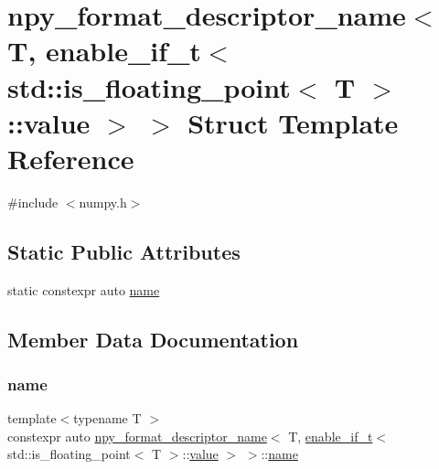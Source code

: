 \hypertarget{structnpy__format__descriptor__name_3_01_t_00_01enable__if__t_3_01std_1_1is__floating__point_3_01_t_01_4_1_1value_01_4_01_4}{}\section{npy\+\_\+format\+\_\+descriptor\+\_\+name$<$ T, enable\+\_\+if\+\_\+t$<$ std\+::is\+\_\+floating\+\_\+point$<$ T $>$\+::value $>$ $>$ Struct Template Reference}
\label{structnpy__format__descriptor__name_3_01_t_00_01enable__if__t_3_01std_1_1is__floating__point_3_01_t_01_4_1_1value_01_4_01_4}


{\ttfamily \#include $<$numpy.\+h$>$}

\subsection*{Static Public Attributes}
\begin{DoxyCompactItemize}
\item 
static constexpr auto \mbox{\hyperlink{structnpy__format__descriptor__name_3_01_t_00_01enable__if__t_3_01std_1_1is__floating__point_3_01_t_01_4_1_1value_01_4_01_4_a3539b56b508a6febec17fb61d25d3c05}{name}}
\end{DoxyCompactItemize}


\subsection{Member Data Documentation}
\mbox{\label{structnpy__format__descriptor__name_3_01_t_00_01enable__if__t_3_01std_1_1is__floating__point_3_01_t_01_4_1_1value_01_4_01_4_a3539b56b508a6febec17fb61d25d3c05}} 
\subsubsection{\texorpdfstring{name}{name}}
{\footnotesize\ttfamily template$<$typename T $>$ \\
constexpr auto \mbox{\hyperlink{structnpy__format__descriptor__name}{npy\+\_\+format\+\_\+descriptor\+\_\+name}}$<$ T, \mbox{\hyperlink{detail_2common_8h_a012819c9e8b5e04872a271f50f8b8196}{enable\+\_\+if\+\_\+t}}$<$ std\+::is\+\_\+floating\+\_\+point$<$ T $>$\+::\mbox{\hyperlink{_s_d_l__opengl__glext_8h_a8ad81492d410ff2ac11f754f4042150f}{value}} $>$ $>$\+::\mbox{\hyperlink{structname}{name}}\hspace{0.3cm}{\ttfamily [static]}}

